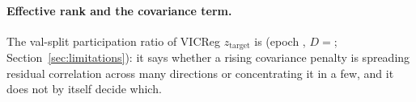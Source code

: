 \paragraph{Effective rank and the covariance term.}
The val-split participation ratio of VICReg $z_{\mathrm{target}}$ is \EffRankTgtVicreg{} (epoch \EffRankCkptEpochVicreg{}, $D{=}$\ZTLatentDim{}; Section~\ref{sec:limitations}): it says whether a rising covariance penalty is spreading residual correlation across many directions or concentrating it in a few, and it does not by itself decide which.
